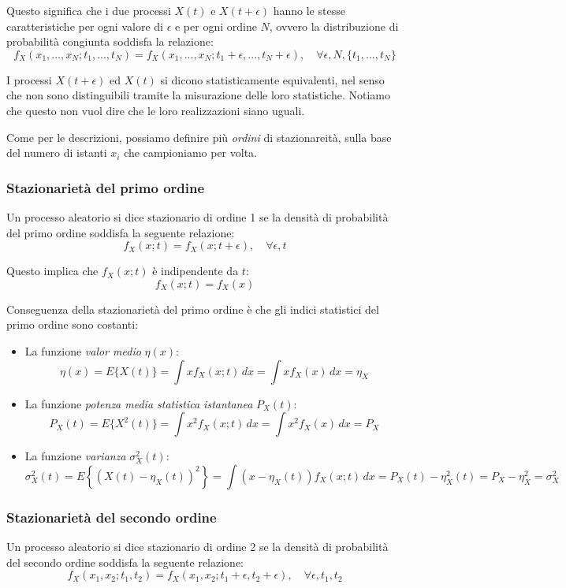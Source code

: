\documentclass[a4paper,11pt]{article}
\begin{document}
Questo significa che i due processi $X(t)$ e $X(t + \epsilon)$ hanno le stesse caratteristiche per ogni valore di $\epsilon$ e per ogni ordine $N$, ovvero la distribuzione di probabilità congiunta soddisfa la relazione:
$$
f_X(x_1, ..., x_N; t_1, ..., t_N) = f_X(x_1, ..., x_N; t_1 + \epsilon, ..., t_N + \epsilon), \quad \forall \epsilon, N, \{ t_1 , ..., t_N \}
$$

I processi $X(t + \epsilon)$ ed $X(t)$ si dicono statisticamente equivalenti, nel senso che non sono distinguibili tramite la misurazione delle loro statistiche. Notiamo che questo non vuol dire che le loro realizzazioni siano uguali.

Come per le descrizioni, possiamo definire più \textit{ordini} di stazionareità, sulla base del numero di istanti $x_i$ che campioniamo per volta.

\subsubsection{Stazionarietà del primo ordine}
Un processo aleatorio si dice stazionario di ordine 1 se la densità di probabilità del primo ordine soddisfa la seguente relazione:
$$
f_X(x;t) = f_X(x; t + \epsilon), \quad \forall \epsilon, t
$$

Questo implica che $f_X(x;t)$ è indipendente da $t$:
$$
f_X(x;t) = f_X(x)
$$

Conseguenza della stazionarietà del primo ordine è che gli indici statistici del primo ordine sono costanti:
\begin{itemize}
\item La funzione \textit{valor medio} $\eta(x)$:
$$
\eta(x) = E\{X(t)\} = \int x f_X(x;t) \, dx = \int x f_X(x) \, dx = \eta_X
$$
\item La funzione \textit{potenza media statistica istantanea} $P_X(t)$:
$$
P_X(t) = E\{X^2(t)\} = \int x^2 f_X(x;t) \, dx = \int x^2 f_X(x) \, dx = P_X
$$
\item La funzione \textit{varianza} $\sigma^2_X(t)$:
$$
\sigma^2_X(t) = E\left\{ (X(t) - \eta_X(t))^2 \right\} = \int (x - \eta_X(t)) f_X(x;t) \, dx = P_X(t) - \eta^2_X(t) = P_X - \eta^2_X = \sigma^2_X
$$
\end{itemize}

\subsubsection{Stazionarietà del secondo ordine}
Un processo aleatorio si dice stazionario di ordine 2 se la densità di probabilità del secondo ordine soddisfa la seguente relazione:
$$
f_X(x_1, x_2; t_1, t_2) = f_X(x_1, x_2; t_1 + \epsilon, t_2 + \epsilon), \quad \forall \epsilon, t_1, t_2
$$
\end{document}
